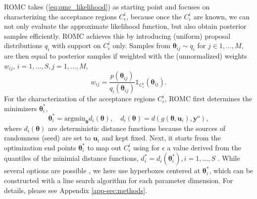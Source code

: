 \documentclass[twoside]{article}
\newcommand{\thb}{\boldsymbol{\theta}}
\newcommand{\ub}{\mathbf{u}}
\newcommand{\data}{\mathbf{y}^o}
\newcommand{\accregioni}{C_{\epsilon}^i}
\newcommand{\E}{\mathbb{E}}
\begin{document}

ROMC takes (\ref{eq:omc_likelihood}) as starting point and focuses on characterizing the acceptance regions $\accregioni$, because once the $\accregioni$ are known, we can not only evaluate the approximate likelihood function, but also obtain posterior samples efficiently. ROMC achieves this by introducing (uniform) proposal distributions $q_i$ with support on $\accregioni$ only. Samples from $\thb_{ij} \sim q_i$ for $j \in 1,\ldots, M$, are then equal to posterior samples if weighted with the (unnormalized) weights $w_{ij}$, $i=1, \ldots, S, j=1, \ldots, M$,
\begin{equation}
w_{ij} = \frac{p(\thb_{ij})}{q_i(\thb_{ij})} \mathbb{1}_{C^i_{\epsilon}}(\thb_{ij}) \label{eq:romc_weight}.
\end{equation}
For the characterization of the acceptance regions $\accregioni$, ROMC first determines the minimizers $\thb_i^*$,
\begin{equation}
 \thb_i^* = \text{argmin}_{\thb} d_i(\thb),\quad d_i(\thb) = d(g(\thb, \ub_i), \data),       
 \label{eq:optim_end_points}
\end{equation}
where $d_i(\thb)$ are deterministic distance functions because the sources of randomness (seed) are set to $\ub_i$ and kept fixed.
Next, it starts from the optimization end points $\thb_i^*$ to map out $\accregioni$ using for $\epsilon$ a value derived from the quantiles of the minimial distance functions, $d_i^*=d_i(\thb_i^*), i=1, \ldots, S$ \citep[see][for details]{ikonomov2020robust}. While several options are possible \citep{ikonomov2020robust}, we here use hyperboxes centered at $\thb_i^*$, which can be constructed with a line search algorithm for each parameter dimension. For details, please see Appendix \ref{app-sec:methods}.
\end{document}
